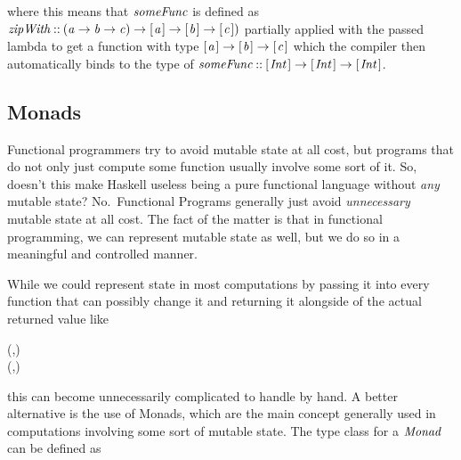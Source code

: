 \documentclass[paper=A4,twoside=true,openright,parskip=full,chapterprefix=true,headings=normal,bibliography=totoc,listof=totoc,titlepage=on,captions=tableabove,draft=false,british]{scrreprt}%
\begin{document}
where this means that \ensuremath{\Varid{someFunc}} is defined as
\ensuremath{\Varid{zipWith}\mathbin{::}(\Varid{a}\to \Varid{b}\to \Varid{c})\to [\mskip1.5mu \Varid{a}\mskip1.5mu]\to [\mskip1.5mu \Varid{b}\mskip1.5mu]\to [\mskip1.5mu \Varid{c}\mskip1.5mu])} partially applied with
the passed lambda to get a function with type \ensuremath{[\mskip1.5mu \Varid{a}\mskip1.5mu]\to [\mskip1.5mu \Varid{b}\mskip1.5mu]\to [\mskip1.5mu \Varid{c}\mskip1.5mu]} which
the compiler then automatically binds to the type of
\ensuremath{\Varid{someFunc}\mathbin{::}[\mskip1.5mu \Conid{Int}\mskip1.5mu]\to [\mskip1.5mu \Conid{Int}\mskip1.5mu]\to [\mskip1.5mu \Conid{Int}\mskip1.5mu]}.

\hypertarget{monads}{%
\subsection{Monads}\label{monads}}

\label{sec:monads}

Functional programmers try to avoid mutable state at all cost, but
programs that do not only just compute some function usually involve
some sort of it. So, doesn't this make Haskell useless being a pure
functional language without \emph{any} mutable state? No.~Functional
Programs generally just avoid \emph{unnecessary} mutable state at all
cost. The fact of the matter is that in functional programming, we can
represent mutable state as well, but we do so in a meaningful and
controlled manner.

While we could represent state in most computations by passing
it into every function that can possibly change it and returning it
alongside of the actual returned value like


\begin{hscode}\SaveRestoreHook
{}%
%
%
\>[B]{}\mathbin{::}\to {}\to (,){}\<[E]%
\\
\>[B]{}\;\;\mathrel{=}(\mathbin{+},){}\<[E]%
\\
\>[B]{}\<[5]%
\>[5]{}\;\mathrel{=}\;\<[E]%
\ColumnHook
\end{hscode}\resethooks
\vspace{-2\baselineskip}

this can become unnecessarily complicated to handle by hand. A better
alternative is the use of Monads, which are the main concept generally
used in computations involving some sort of mutable state. The type
class for a \ensuremath{\Conid{Monad}} can be defined as
\end{document}
